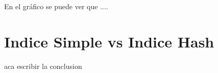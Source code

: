 \documentclass[a4paper, 10pt, twoside]{article}
\begin{document}
En el gr\'afico se puede ver que ....






\section{Indice Simple vs Indice Hash}
aca escribir la conclusion 
\end{document}
